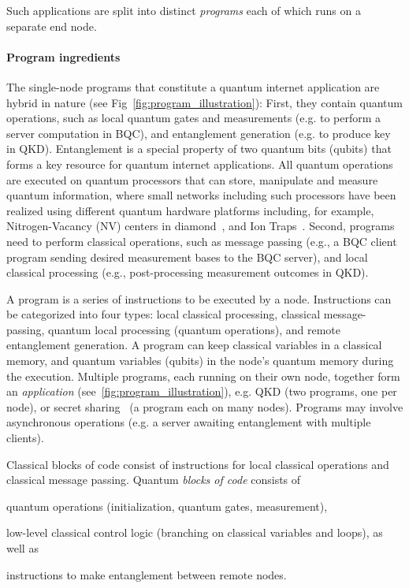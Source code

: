 Such applications are split into distinct \textit{programs} each of which runs on a separate end node.


\paragraph{Program ingredients}

The single-node programs that constitute a quantum internet application are hybrid in nature (see Fig~\ref{fig:program_illustration}):
First, they contain quantum operations, such as local quantum gates and measurements (e.g. to perform a server computation in BQC), and entanglement generation (e.g. to produce key in QKD). Entanglement is a special property of two quantum bits (qubits) that forms a key resource for quantum internet applications. 
All quantum operations are executed on quantum processors that can store, manipulate and measure quantum information, where small networks including such processors have been realized using different quantum hardware platforms including, for example,  Nitrogen-Vacancy (NV) centers in diamond~\cite{pompili2021realization}, and Ion Traps~\cite{krutyanskiy2023entanglement}.
Second, programs need to perform classical operations, such as message passing (e.g., a BQC client program sending desired measurement bases to the BQC server), and local classical processing (e.g., post-processing measurement outcomes in QKD).


A program is a series of instructions to be executed by a node.
Instructions can be categorized into four types: local classical processing, classical message-passing, quantum local processing (quantum operations), and remote entanglement generation.
A program can keep classical variables in a classical memory, and quantum variables (qubits) in the node's quantum memory during the execution.
Multiple programs, each running on their own node, together form an \textit{application} (see~\ref{fig:program_illustration}), e.g. QKD (two programs, one per node),
or secret sharing~\cite{hillery1999quantum} (a program each on many nodes).
Programs may involve asynchronous operations (e.g. a server awaiting entanglement with multiple clients).


Classical blocks of code consist of instructions for local classical operations and classical message passing. Quantum \emph{blocks of code} consists of
%
\begin{inlinelist}
\item quantum operations (initialization, quantum gates, measurement), 
\item low-level classical control logic (branching on classical variables and loops), as well as 
\item instructions to make entanglement between remote nodes. 
\end{inlinelist}
%

